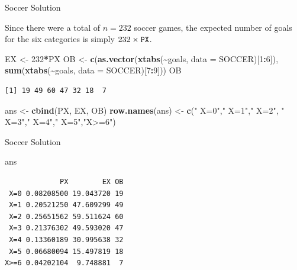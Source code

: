 \documentclass[
  ignorenonframetext,
]{beamer}
\newenvironment{Shaded}{\begin{snugshade}}{\end{snugshade}}
\newcommand{\AttributeTok}[1]{\textcolor[rgb]{0.13,0.29,0.53}{#1}}
\newcommand{\DecValTok}[1]{\textcolor[rgb]{0.00,0.00,0.81}{#1}}
\newcommand{\FunctionTok}[1]{\textcolor[rgb]{0.13,0.29,0.53}{\textbf{#1}}}
\newcommand{\NormalTok}[1]{#1}
\newcommand{\OtherTok}[1]{\textcolor[rgb]{0.56,0.35,0.01}{#1}}
\newcommand{\SpecialCharTok}[1]{\textcolor[rgb]{0.81,0.36,0.00}{\textbf{#1}}}
\newcommand{\StringTok}[1]{\textcolor[rgb]{0.31,0.60,0.02}{#1}}
\begin{document}
\begin{frame}[fragile]{Soccer Solution}
\protect\hypertarget{soccer-solution-2}{}
\begin{tcolorbox}
Since there were a total of $n=232$ soccer games, the expected
number of goals for the six categories is simply $232 \times
\tt{PX}$.
\end{tcolorbox}

\begin{Shaded}
\begin{Highlighting}[]
\NormalTok{EX }\OtherTok{\textless{}{-}} \DecValTok{232}\SpecialCharTok{*}\NormalTok{PX}
\NormalTok{OB }\OtherTok{\textless{}{-}} \FunctionTok{c}\NormalTok{(}\FunctionTok{as.vector}\NormalTok{(}\FunctionTok{xtabs}\NormalTok{(}\SpecialCharTok{\textasciitilde{}}\NormalTok{goals, }\AttributeTok{data =}\NormalTok{ SOCCER)[}\DecValTok{1}\SpecialCharTok{:}\DecValTok{6}\NormalTok{]), }
        \FunctionTok{sum}\NormalTok{(}\FunctionTok{xtabs}\NormalTok{(}\SpecialCharTok{\textasciitilde{}}\NormalTok{goals, }\AttributeTok{data =}\NormalTok{ SOCCER)[}\DecValTok{7}\SpecialCharTok{:}\DecValTok{9}\NormalTok{]))}
\NormalTok{OB}
\end{Highlighting}
\end{Shaded}

\begin{verbatim}
[1] 19 49 60 47 32 18  7
\end{verbatim}

\begin{Shaded}
\begin{Highlighting}[]
\NormalTok{ans }\OtherTok{\textless{}{-}} \FunctionTok{cbind}\NormalTok{(PX, EX, OB)}
\FunctionTok{row.names}\NormalTok{(ans) }\OtherTok{\textless{}{-}} \FunctionTok{c}\NormalTok{(}\StringTok{" X=0"}\NormalTok{,}\StringTok{" X=1"}\NormalTok{,}\StringTok{" X=2"}\NormalTok{, }
                    \StringTok{" X=3"}\NormalTok{,}\StringTok{" X=4"}\NormalTok{,}\StringTok{" X=5"}\NormalTok{,}\StringTok{"X\textgreater{}=6"}\NormalTok{)}
\end{Highlighting}
\end{Shaded}
\end{frame}

\begin{frame}[fragile]{Soccer Solution}
\protect\hypertarget{soccer-solution-3}{}
\begin{Shaded}
\begin{Highlighting}[]
\NormalTok{ans}
\end{Highlighting}
\end{Shaded}

\begin{verbatim}
             PX        EX OB
 X=0 0.08208500 19.043720 19
 X=1 0.20521250 47.609299 49
 X=2 0.25651562 59.511624 60
 X=3 0.21376302 49.593020 47
 X=4 0.13360189 30.995638 32
 X=5 0.06680094 15.497819 18
X>=6 0.04202104  9.748881  7
\end{verbatim}
\end{frame}
\end{document}
